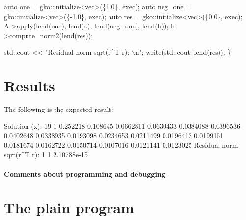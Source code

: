 \begin{DoxyCode}
    \textcolor{keyword}{auto} \hyperlink{namespacegko_a0059e27f8f4bc348ff65c1e60caf47c8}{one} = gko::initialize<vec>(\{1.0\}, exec);
    \textcolor{keyword}{auto} neg\_one = gko::initialize<vec>(\{-1.0\}, exec);
    \textcolor{keyword}{auto} res = gko::initialize<vec>(\{0.0\}, exec);
    A->apply(\hyperlink{namespacegko_aa8cb4876b72e5e1036ea9575443c439b}{lend}(one), \hyperlink{namespacegko_aa8cb4876b72e5e1036ea9575443c439b}{lend}(x), \hyperlink{namespacegko_aa8cb4876b72e5e1036ea9575443c439b}{lend}(neg\_one), \hyperlink{namespacegko_aa8cb4876b72e5e1036ea9575443c439b}{lend}(b));
    b->compute\_norm2(\hyperlink{namespacegko_aa8cb4876b72e5e1036ea9575443c439b}{lend}(res));

    std::cout << \textcolor{stringliteral}{"Residual norm sqrt(r^T r): \(\backslash\)n"};
    \hyperlink{namespacegko_a859dc47a462721d83728d91ab7fa2148}{write}(std::cout, \hyperlink{namespacegko_aa8cb4876b72e5e1036ea9575443c439b}{lend}(res));
\}
\end{DoxyCode}
 \label{_Results}%
\section*{Results}

The following is the expected result\+:


\begin{DoxyCode}
Solution (x):
19 1
0.252218
0.108645
0.0662811
0.0630433
0.0384088
0.0396536
0.0402648
0.0338935
0.0193098
0.0234653
0.0211499
0.0196413
0.0199151
0.0181674
0.0162722
0.0150714
0.0107016
0.0121141
0.0123025
Residual norm sqrt(r^T r):
1 1
2.10788e-15
\end{DoxyCode}


\label{_Commentsaboutprogramminganddebugging}%
\paragraph*{Comments about programming and debugging }

\label{_PlainProg}%
 \section*{The plain program}



